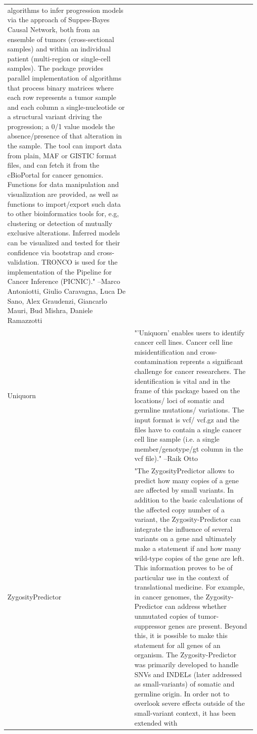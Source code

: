 \begin{longtable}[t]{l>{\raggedright\arraybackslash}p{25em}}
algorithms to infer progression models via the approach of
Suppes-Bayes Causal Network, both from an ensemble of tumors
(cross-sectional samples) and within an individual patient
(multi-region or single-cell samples). The package provides
parallel implementation of algorithms that process binary
matrices where each row represents a tumor sample and each
column a single-nucleotide or a structural variant driving the
progression; a 0/1 value models the absence/presence of that
alteration in the sample. The tool can import data from plain,
MAF or GISTIC format files, and can fetch it from the
cBioPortal for cancer genomics. Functions for data manipulation
and visualization are provided, as well as functions to
import/export such data to other bioinformatics tools for, e.g,
clustering or detection of mutually exclusive alterations.
Inferred models can be visualized and tested for their
confidence via bootstrap and cross-validation. TRONCO is used
for the implementation of the Pipeline for Cancer Inference
(PICNIC)." --Marco Antoniotti, Giulio Caravagna, Luca De Sano, Alex Graudenzi, Giancarlo Mauri, Bud Mishra, Daniele Ramazzotti\\
Uniquorn & "'Uniquorn' enables users to identify cancer cell lines.
Cancer cell line misidentification and cross-contamination
reprents a significant challenge for cancer researchers. The
identification is vital and in the frame of this package based
on the locations/ loci of somatic and germline mutations/
variations. The input format is vcf/ vcf.gz and the files have
to contain a single cancer cell line sample (i.e. a single
member/genotype/gt column in the vcf file)." --Raik Otto\\
ZygosityPredictor & "The ZygosityPredictor allows to predict how many copies of
a gene are affected by small variants. In addition to the basic
calculations of the affected copy number of a variant, the
Zygosity-Predictor can integrate the influence of several
variants on a gene and ultimately make a statement if and how
many wild-type copies of the gene are left. This information
proves to be of particular use in the context of translational
medicine. For example, in cancer genomes, the
Zygosity-Predictor can address whether unmutated copies of
tumor-suppressor genes are present. Beyond this, it is possible
to make this statement for all genes of an organism. The
Zygosity-Predictor was primarily developed to handle SNVs and
INDELs (later addressed as small-variants) of somatic and
germline origin. In order not to overlook severe effects
outside of the small-variant context, it has been extended with

\end{longtable}
